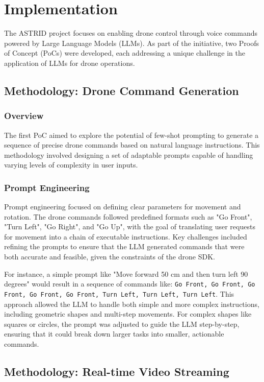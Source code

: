 \chapter{Implementation}
\label{implementation}

The \ac{ASTRID} project focuses on enabling drone control through voice commands powered by Large Language Models (\acp{LLM}). 
As part of the initiative, two Proofs of Concept (\acp{PoC}) were developed, each addressing a unique challenge in the application of \acp{LLM} for drone operations.

\section{Methodology: Drone Command Generation}
\subsection{Overview}
The first \ac{PoC} aimed to explore the potential of few-shot prompting to generate a sequence of precise drone commands based on natural language instructions. 
This methodology involved designing a set of adaptable prompts capable of handling varying levels of complexity in user inputs.

\subsection{Prompt Engineering}
Prompt engineering focused on defining clear parameters for movement and rotation. The drone commands followed predefined formats such as "Go Front", "Turn Left", "Go Right", and "Go Up", 
with the goal of translating user requests for movement into a chain of executable instructions. 
Key challenges included refining the prompts to ensure that the \ac{LLM} generated commands that were both accurate and feasible, given the constraints of the drone SDK.

For instance, a simple prompt like "Move forward 50 cm and then turn left 90 degrees" would result in a sequence of commands like:  
\texttt{Go Front, Go Front, Go Front, Go Front, Go Front, Turn Left, Turn Left, Turn Left}.  
This approach allowed the \ac{LLM} to handle both simple and more complex instructions, including geometric shapes and multi-step movements. 
For complex shapes like squares or circles, the prompt was adjusted to guide the \ac{LLM} step-by-step, ensuring that it could break down larger tasks into smaller, actionable commands.

\section{Methodology: Real-time Video Streaming}
